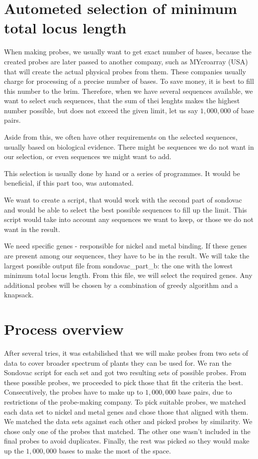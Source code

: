\section{Autometed selection of minimum total locus length}

When making probes, we usually want to get exact number of bases, because the created probes are later passed to another 
company, such as MYcroarray (USA) \cite{mycroarray} that will create the actual physical probes from them. These companies 
usually charge for processing of a precise number of bases. To save money, it is best to fill this number to the brim. 
Therefore, when we have several sequences available, we want to select such sequences, that the sum of thei lenghts makes the 
highest number possible, but does not exceed the given limit, let us say $1,000,000$ of base pairs. 

Aside from this, we often have other requirements on the selected sequences, usually based on biological evidence. There might be 
sequences we do not want in our selection, or even sequences we might want to add. 

This selection is usually done by hand or a series of programmes. It would be beneficial, if this part too, was automated. 

We want to create a script, that would work with the second part of sondovac and would be able to select the best possible 
sequences to fill up the limit. This script would take into account any sequences we want to keep, or those we do not want in 
the result. 

We need specific genes - responsible for nickel and metal binding. If these genes are present among our sequences, they have 
to be in the result. We will take the largest possible output file from sondovac\_part\_b: the one with the lowest minimum total locus length. 
From this file, we will select the required genes. Any additional probes will be chosen by a combination of greedy algorithm and a knapsack. 


\section{Process overview}
After several tries, it was estabilished that we will make probes from two sets of data to cover broader spectrum of plants they can 
be used for. We ran the Sondovac script for each set and got two resulting sets of possible probes. From these possible probes, we 
proceeded to pick those that fit the criteria the best. Consecutively, the probes have to make up to $1,000,000$ base pairs, due to 
restrictions of the probe-making company. 
To pick suitable probes, we matched each data set to nickel and metal genes and chose those that aligned with them. We matched the 
data sets against each other and picked probes by similarity. We chose only one of the probes that matched. The other one 
wasn't included in the final probes to avoid duplicates. Finally, the rest was picked so they would make up the $1,000,000$ bases to 
make the most of the space. 

